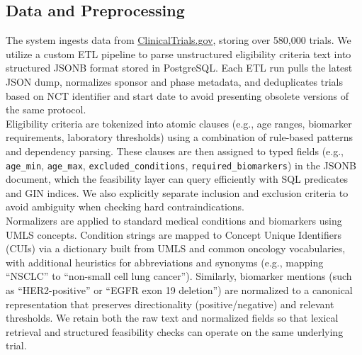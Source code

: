 \documentclass[11pt]{article}
\begin{document}
\subsection{Data and Preprocessing}
The system ingests data from \url{ClinicalTrials.gov}, storing over 580{,}000 trials. We utilize a custom ETL pipeline to parse unstructured eligibility criteria text into structured JSONB format stored in PostgreSQL. Each ETL run pulls the latest JSON dump, normalizes sponsor and phase metadata, and deduplicates trials based on NCT identifier and start date to avoid presenting obsolete versions of the same protocol.\\
Eligibility criteria are tokenized into atomic clauses (e.g., age ranges, biomarker requirements, laboratory thresholds) using a combination of rule-based patterns and dependency parsing. These clauses are then assigned to typed fields (e.g., \texttt{age\_min}, \texttt{age\_max}, \texttt{excluded\_conditions}, \texttt{required\_biomarkers}) in the JSONB document, which the feasibility layer can query efficiently with SQL predicates and GIN indices. We also explicitly separate inclusion and exclusion criteria to avoid ambiguity when checking hard contraindications.\\
Normalizers are applied to standard medical conditions and biomarkers using UMLS concepts. Condition strings are mapped to Concept Unique Identifiers (CUIs) via a dictionary built from UMLS and common oncology vocabularies, with additional heuristics for abbreviations and synonyms (e.g., mapping “NSCLC” to “non-small cell lung cancer”). Similarly, biomarker mentions (such as “HER2-positive” or “EGFR exon 19 deletion”) are normalized to a canonical representation that preserves directionality (positive/negative) and relevant thresholds. We retain both the raw text and normalized fields so that lexical retrieval and structured feasibility checks can operate on the same underlying trial.
\end{document}
